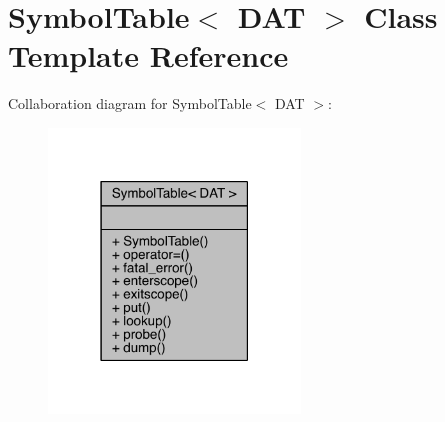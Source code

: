 \hypertarget{class_symbol_table}{}\section{Symbol\+Table$<$ D\+AT $>$ Class Template Reference}
\label{class_symbol_table}


Collaboration diagram for Symbol\+Table$<$ D\+AT $>$\+:\nopagebreak
\begin{figure}[H]
\begin{center}
\leavevmode
\includegraphics[width=190pt]{class_symbol_table__coll__graph}
\end{center}
\end{figure}

